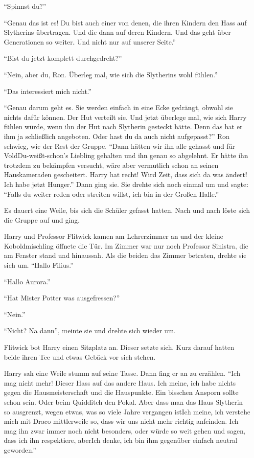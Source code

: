 \enquote{Spinnst du?}

\enquote{Genau das ist es! Du bist auch einer von denen, die ihren Kindern den Hass auf Slytherins übertragen. Und die dann auf deren Kindern. Und das geht über Generationen so weiter. Und nicht nur auf unserer Seite.}

\enquote{Bist du jetzt komplett durchgedreht?}

\enquote{Nein, aber du, Ron. Überleg mal, wie sich die Slytherins wohl fühlen.}

\enquote{Das interessiert mich nicht.}

\enquote{Genau darum geht es. Sie werden einfach in eine Ecke gedrängt, obwohl sie nichts dafür können. Der Hut verteilt sie. Und jetzt überlege mal, wie sich Harry fühlen würde, wenn ihn der Hut nach Slytherin gesteckt hätte. Denn das hat er ihm ja schließlich angeboten. Oder hast du da auch nicht aufgepasst?} Ron schwieg, wie der Rest der Gruppe. \enquote{Dann hätten wir ihn alle gehasst und für Vold\aabs Du-weißt-schon’s Liebling gehalten und ihn genau so abgelehnt. Er hätte ihn trotzdem zu bekämpfen versucht, wäre aber vermutlich schon an seinen Hauskameraden gescheitert. Harry hat recht! Wird Zeit, dass sich da was ändert! Ich habe jetzt Hunger.} Dann ging sie. Sie drehte sich noch einmal um und sagte: \enquote{Falls du weiter reden oder streiten willst, ich bin in der Großen Halle.}

Es dauert eine Weile, bis sich die Schüler gefasst hatten. Nach und nach löste sich die Gruppe auf und ging.

\trenn

Harry und Professor Flitwick kamen am Lehrerzimmer an und der kleine Koboldmischling öffnete die Tür. Im Zimmer war nur noch Professor Sinistra, die am Fenster stand und hinaussah. Als die beiden das Zimmer betraten, drehte sie sich um. \enquote{Hallo Filius.}

\enquote{Hallo Aurora.}

\enquote{Hat Mister Potter was ausgefressen?}

\enquote{Nein.}

\enquote{Nicht? Na dann}, meinte sie und drehte sich wieder um.

Flitwick bot Harry einen Sitzplatz an. Dieser setzte sich. Kurz darauf hatten beide ihren Tee und etwas Gebäck vor sich stehen.

Harry sah eine Weile stumm auf seine Tasse. Dann fing er an zu erzählen. \enquote{Ich mag nicht mehr! Dieser Hass auf das andere Haus. Ich meine, ich habe nichts gegen die Hausmeisterschaft und die Hauspunkte. Ein bisschen Ansporn sollte schon sein. Oder beim Quidditch den Pokal. Aber dass man das Haus Slytherin so ausgrenzt, wegen etwas, was so viele Jahre vergangen ist\abs Ich meine, ich verstehe mich mit Draco mittlerweile so, dass wir uns nicht mehr richtig anfeinden. Ich mag ihn zwar immer noch nicht besonders, oder würde so weit gehen und sagen, dass ich ihn respektiere, aber\abs Ich denke, ich bin ihm gegenüber einfach neutral geworden.}

